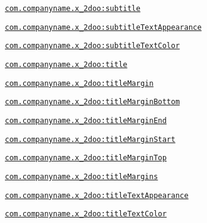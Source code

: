 {\tt \hyperlink{classandroid_1_1support_1_1v4_1_1_r_1_1styleable_477282d30e4e1d001d974339d5a3612e}{com.companyname.x\_\-2doo:subtitle}}

{\tt \hyperlink{classandroid_1_1support_1_1v4_1_1_r_1_1styleable_591a12ae0a18148eb5e6102631e7a595}{com.companyname.x\_\-2doo:subtitleTextAppearance}}

{\tt \hyperlink{classandroid_1_1support_1_1v4_1_1_r_1_1styleable_6aafb77e85baad2d0ed9e1879c82cf10}{com.companyname.x\_\-2doo:subtitleTextColor}}

{\tt \hyperlink{classandroid_1_1support_1_1v4_1_1_r_1_1styleable_b046a72644d4b4e207982a1e5afea260}{com.companyname.x\_\-2doo:title}}

{\tt \hyperlink{classandroid_1_1support_1_1v4_1_1_r_1_1styleable_4b5c6289c4f1411b5ea97486e152a575}{com.companyname.x\_\-2doo:titleMargin}}

{\tt \hyperlink{classandroid_1_1support_1_1v4_1_1_r_1_1styleable_433a3c5c0de8d666a83b66f953bf878b}{com.companyname.x\_\-2doo:titleMarginBottom}}

{\tt \hyperlink{classandroid_1_1support_1_1v4_1_1_r_1_1styleable_ebea2a680be1013dc5ca88339b9360c2}{com.companyname.x\_\-2doo:titleMarginEnd}}

{\tt \hyperlink{classandroid_1_1support_1_1v4_1_1_r_1_1styleable_037398ad6eb4fa7d2271f386c71d7350}{com.companyname.x\_\-2doo:titleMarginStart}}

{\tt \hyperlink{classandroid_1_1support_1_1v4_1_1_r_1_1styleable_1a1bd2c6b7f34b8a59f7763da63777e2}{com.companyname.x\_\-2doo:titleMarginTop}}

{\tt \hyperlink{classandroid_1_1support_1_1v4_1_1_r_1_1styleable_4cf3f31b90bbd9298763173e8ae75087}{com.companyname.x\_\-2doo:titleMargins}}

{\tt \hyperlink{classandroid_1_1support_1_1v4_1_1_r_1_1styleable_bced41bbc6326ea8b574802f6d167432}{com.companyname.x\_\-2doo:titleTextAppearance}}

{\tt \hyperlink{classandroid_1_1support_1_1v4_1_1_r_1_1styleable_16f85315e8a126339f05a6869996771b}{com.companyname.x\_\-2doo:titleTextColor}}

